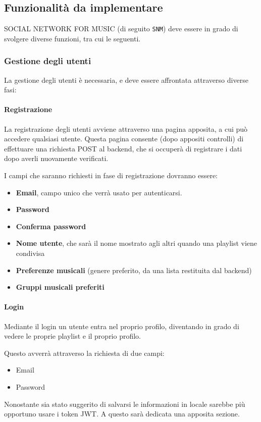 \subsection{Funzionalità da implementare}
\uppercase{Social Network for Music} (di seguito \verb|SNM|) deve essere in grado di svolgere diverse funzioni, tra cui le seguenti.
\subsubsection{Gestione degli utenti}
La gestione degli utenti è necessaria, e deve essere affrontata attraverso diverse fasi:
\paragraph{Registrazione} La registrazione degli utenti avviene attraverso una pagina apposita, a cui può accedere qualsiasi utente. Questa pagina consente (dopo appositi controlli) di effettuare una richiesta POST al backend, che si occuperà di registrare i dati dopo averli nuovamente verificati.

I campi che saranno richiesti in fase di registrazione dovranno essere:
\begin{itemize}
    \item \textbf{Email}, campo unico che verrà usato per autenticarsi.
    \item \textbf{Password}
    \item \textbf{Conferma password}
    \item \textbf{Nome utente}, che sarà il nome mostrato agli altri quando una playlist viene condivisa
    \item \textbf{Preferenze musicali} (genere preferito, da una lista restituita dal backend)
    \item \textbf{Gruppi musicali preferiti}
\end{itemize}
\paragraph{Login} Mediante il login un utente entra nel proprio profilo, diventando in grado di vedere le proprie playlist e il proprio profilo.

Questo avverrà attraverso la richiesta di due campi:
\begin{itemize}
    \item Email
    \item Password
\end{itemize}

Nonostante sia stato suggerito di salvarsi le informazioni in locale sarebbe più opportuno usare i token JWT. A questo sarà dedicata una apposita sezione.
